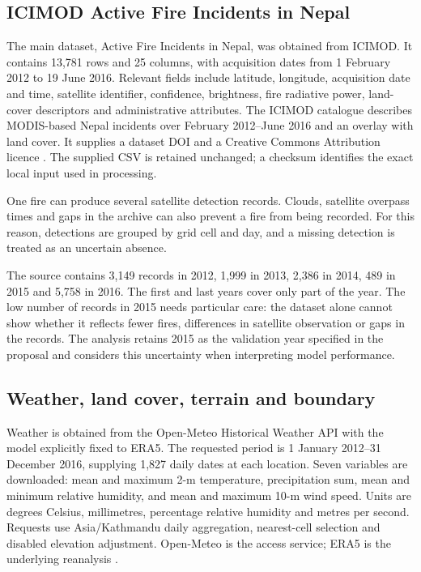 \documentclass[conference,a4paper]{IEEEtran}
\begin{document}
\subsection{ICIMOD Active Fire Incidents in Nepal}
The main dataset, Active Fire Incidents in Nepal, was obtained from ICIMOD. It contains 13,781 rows and 25 columns, with acquisition dates from 1 February 2012 to 19 June 2016. Relevant fields include latitude, longitude, acquisition date and time, satellite identifier, confidence, brightness, fire radiative power, land-cover descriptors and administrative attributes. The ICIMOD catalogue describes MODIS-based Nepal incidents over February 2012--June 2016 and an overlay with land cover. It supplies a dataset DOI and a Creative Commons Attribution licence \citep{icimodfire}. The supplied CSV is retained unchanged; a checksum identifies the exact local input used in processing.

One fire can produce several satellite detection records. Clouds, satellite overpass times and gaps in the archive can also prevent a fire from being recorded. For this reason, detections are grouped by grid cell and day, and a missing detection is treated as an uncertain absence.

The source contains 3,149 records in 2012, 1,999 in 2013, 2,386 in 2014, 489 in 2015 and 5,758 in 2016. The first and last years cover only part of the year. The low number of records in 2015 needs particular care: the dataset alone cannot show whether it reflects fewer fires, differences in satellite observation or gaps in the records. The analysis retains 2015 as the validation year specified in the proposal and considers this uncertainty when interpreting model performance.

\subsection{Weather, land cover, terrain and boundary}
Weather is obtained from the Open-Meteo Historical Weather API with the model explicitly fixed to ERA5. The requested period is 1 January 2012--31 December 2016, supplying 1,827 daily dates at each location. Seven variables are downloaded: mean and maximum 2-m temperature, precipitation sum, mean and minimum relative humidity, and mean and maximum 10-m wind speed. Units are degrees Celsius, millimetres, percentage relative humidity and metres per second. Requests use Asia/Kathmandu daily aggregation, nearest-cell selection and disabled elevation adjustment. Open-Meteo is the access service; ERA5 is the underlying reanalysis \citep{openmeteo,hersbach}.
\end{document}
